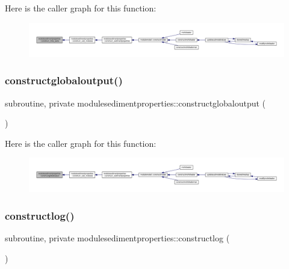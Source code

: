 Here is the caller graph for this function\+:\nopagebreak
\begin{figure}[H]
\begin{center}
\leavevmode
\includegraphics[width=350pt]{namespacemodulesedimentproperties_a96254e985001cdec16870dc8c0188366_icgraph}
\end{center}
\end{figure}
\mbox{\label{namespacemodulesedimentproperties_a003638c1656ce528c586d7f167d3d025}} 
\subsubsection{\texorpdfstring{constructglobaloutput()}{constructglobaloutput()}}
{\footnotesize\ttfamily subroutine, private modulesedimentproperties\+::constructglobaloutput (\begin{DoxyParamCaption}{ }\end{DoxyParamCaption})\hspace{0.3cm}{\ttfamily [private]}}

Here is the caller graph for this function\+:\nopagebreak
\begin{figure}[H]
\begin{center}
\leavevmode
\includegraphics[width=350pt]{namespacemodulesedimentproperties_a003638c1656ce528c586d7f167d3d025_icgraph}
\end{center}
\end{figure}
\mbox{\label{namespacemodulesedimentproperties_a8adc335e0f9814d9866b9c91620279fb}} 
\subsubsection{\texorpdfstring{constructlog()}{constructlog()}}
{\footnotesize\ttfamily subroutine, private modulesedimentproperties\+::constructlog (\begin{DoxyParamCaption}{ }\end{DoxyParamCaption})\hspace{0.3cm}{\ttfamily [private]}}

